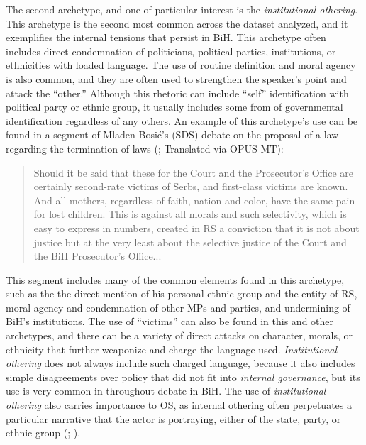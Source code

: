 The second archetype, and one of particular interest is the \textit{institutional othering}. This archetype is the second most common across the dataset analyzed, and it exemplifies the internal tensions that persist in \ac{BiH}. This archetype often includes direct condemnation of politicians, political parties, institutions, or ethnicities with loaded language. The use of routine definition and moral agency is also common, and they are often used to strengthen the speaker's point and attack the ``other.'' Although this rhetoric can include ``self'' identification with political party or ethnic group, it usually includes some from of governmental identification regardless of any others. An example of this archetype's use can be found in a segment of Mladen Bosi{\'c}'s (\ac{SDS}) debate on the proposal of a law regarding the termination of laws (\citealp{mochtak2022}; Translated via OPUS-MT):
\begin{quote}
Should it be said that these for the Court and the Prosecutor's Office are certainly second-rate victims of Serbs, and first-class victims are known. And all mothers, regardless of faith, nation and color, have the same pain for lost children. This is against all morals and such selectivity, which is easy to express in numbers, created in \ac{RS} a conviction that it is not about justice but at the very least about the selective justice of the Court and the \ac{BiH} Prosecutor's Office...
\end{quote}
This segment includes many of the common elements found in this archetype, such as the the direct mention of his personal ethnic group and the entity of \ac{RS}, moral agency and condemnation of other \acp{MP} and parties, and undermining of \ac{BiH}'s institutions. The use of ``victims'' can also be found in this and other archetypes, and there can be a variety of direct attacks on character, morals, or ethnicity that further weaponize and charge the language used. \textit{Institutional othering} does not always include such charged language, because it also includes simple disagreements over policy that did not fit into \textit{internal governance}, but its use is very common in throughout debate in {BiH}. The use of \textit{institutional othering} also carries importance to \ac{OS}, as internal othering often perpetuates a particular narrative that the actor is portraying, either of the state, party, or ethnic group (\citealp[pg.~613-614]{subotic2015}; \citealp[pg.~223-224]{davidPolicingMemoryBosnia2019}). 

